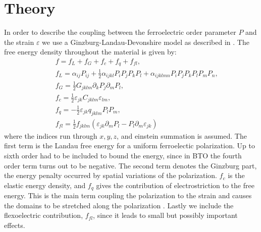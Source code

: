 \section{Theory}
In order to describe the coupling between the ferroelectric order parameter $P$ and the strain $\varepsilon$ we use a Ginzburg-Landau-Devonshire model as described in \cite{Marton2010}. The free energy density throughout the material is given by:
\begin{eqnarray}\label{eq:BTO_energy}
&&f = f_{L}+f_{G}+f_{c}+f_{q}+f_{fl},\\
&&f_{L} = \alpha_{ij}P_{ij} + \frac{1}{2}\alpha_{ijkl}P_{i}P_{j}P_{k}P_{l} + \alpha_{ijklmn} P_i P_j P_k P_l P_m P_n,\\
&&f_{G} = \frac{1}{2}G_{jklm}\partial_k P_j\partial_m P_l,\\
&&f_{c} = \frac{1}{2}\varepsilon_{jk}C_{jklm}\varepsilon_{lm},\\
&&f_{q}=-\frac{1}{2}\varepsilon_{jk}q_{jklm}P_{l}P_{m},\label{eq:qpp}\\
&&f_{fl}=\frac{1}{2}f_{jklm}(\varepsilon_{jk}\partial_mP_l-P_l\partial_m\varepsilon_{jk})
\end{eqnarray}
where the indices run through ${x,y,z}$, and einstein summation is assumed. The first term is the Landau free energy for a uniform ferroelectic polarization. Up to sixth order had to be included to bound the energy, since in BTO the fourth order term turns out to be negative. The second term denotes the Ginzburg part, the energy penalty occurred by spatial variations of the polarization. $f_c$ is the elastic energy density, and $f_q$ gives the contribution of electrostriction to the free energy. This is the main term coupling the polarization to the strain and causes the domains to be stretched along the polarization . Lastly we include the flexoelectric contribution, $f_{fl}$, since it leads to small but possibly important effects.

